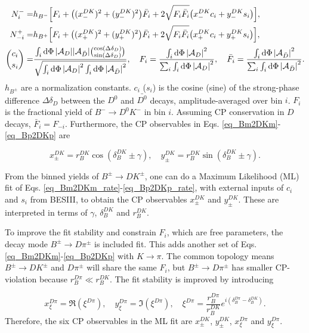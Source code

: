 \documentclass[12pt, a4paper, notitlepage, onecolumn]{article}
\begin{document}
\begin{align}
  N^-_i =& h_{B^-}\Big[F_i + \big((x_-^{DK})^2 + (y_-^{DK})^2\big)\bar{F}_i + 2\sqrt{F_i\bar{F}_i}\big(x_-^{DK}c_i + y_-^{DK}s_i\big)\Big], \label{eq_Bm2DKm_rate} \\
  N^+_{-i} =& h_{B^+}\Big[F_i + \big((x_+^{DK})^2 + (y_+^{DK})^2\big)\bar{F}_i + 2\sqrt{F_i\bar{F}_i}\big(x_+^{DK}c_i + y_+^{DK}s_i\big)\Big], \label{eq_Bp2DKp_rate} \\
  {c_i\choose s_i} =& \frac{\int_i\dd{\Phi}\abs{\mathcal{A}_D}\abs{\mathcal{A}_{\bar{D}}}{\cos(\Delta\delta_D)\choose\sin(\Delta\delta_D)}}{\sqrt{\int_i\dd{\Phi}\abs{\mathcal{A}_D}^2\int_i\dd{\Phi}\abs{\mathcal{A}_{\bar{D}}}^2}}, \quad F_i = \frac{\int_i\dd{\Phi}\abs{\mathcal{A}_D}^2}{\sum_i\int_i\dd{\Phi}\abs{\mathcal{A}_D}^2}, \quad \bar{F}_i = \frac{\int_i\dd{\Phi}\abs{\mathcal{A}_{\bar{D}}}^2}{\sum_i\int_i\dd{\Phi}\abs{\mathcal{A}_{\bar{D}}}^2}. \label{eq_hadronic_parameters}
\end{align}
$h_{B^\pm}$ are a normalization constants. $c_i$ ($s_i$) is the cosine (sine) of the strong-phase difference $\Delta\delta_D$ between the $D^0$ and $\bar{D^0}$ decays, amplitude-averaged over bin $i$. $F_i$ is the fractional yield of $B^-\to D^0K^-$ in bin $i$. Assuming CP conservation in $D$ decays, $\bar{F}_i = F_{-i}$. Furthermore, the CP observables in Eqs. \eqref{eq_Bm2DKm}-\eqref{eq_Bp2DKp} are

\begin{equation}
  x_\pm^{DK} = r_B^{DK}\cos(\delta_B^{DK}\pm\gamma), \quad  y_\pm^{DK} = r_B^{DK}\sin(\delta_B^{DK}\pm\gamma).
  \label{eq_xy_cp}
\end{equation}

From the binned yields of $B^\pm\to DK^\pm$, one can do a Maximum Likelihood (ML) fit of Eqs. \eqref{eq_Bm2DKm_rate}-\eqref{eq_Bp2DKp_rate}, with external inputs of $c_i$ and $s_i$ from BESIII, to obtain the CP observables $x_\pm^{DK}$ and $y_\pm^{DK}$. These are interpreted in terms of $\gamma$, $\delta_B^{DK}$ and $r_B^{DK}$.

To improve the fit stability and constrain $F_i$, which are free parameters, the decay mode $B^\pm\to D\pi^\pm$ is included fit. This adds another set of Eqs. \eqref{eq_Bm2DKm}-\eqref{eq_Bp2DKp} with $K\to\pi$. The common topology means $B^\pm\to DK^\pm$ and $D\pi^\pm$ will share the same $F_i$, but $B^\pm\to D\pi^\pm$ has smaller CP-violation because $r_B^{D\pi}\ll r_B^{DK}$. The fit stability is improved by introducing

\begin{equation*}
  x_\xi^{D\pi} = \Re(\xi^{D\pi}), \quad y_\xi^{D\pi} = \Im(\xi^{D\pi}), \quad \xi^{D\pi} = \frac{r_B^{D\pi}}{r_B^{DK}}e^{i(\delta_B^{D\pi} - \delta_B^{DK})}.
\end{equation*}
Therefore, the six CP observables in the ML fit are $x_\pm^{DK}$, $y_\pm^{DK}$, $x_\xi^{D\pi}$ and $y_\xi^{D\pi}$.
\end{document}
